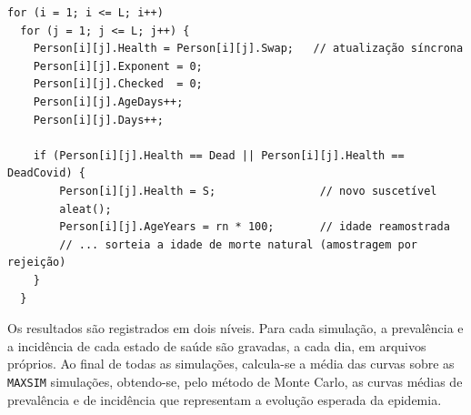 \begin{lstlisting}[caption={Atualização síncrona e substituição dos mortos (\texttt{Updatefunc}).}, label={lst:update}]
for (i = 1; i <= L; i++)
  for (j = 1; j <= L; j++) {
    Person[i][j].Health = Person[i][j].Swap;   // atualização síncrona
    Person[i][j].Exponent = 0;
    Person[i][j].Checked  = 0;
    Person[i][j].AgeDays++;
    Person[i][j].Days++;

    if (Person[i][j].Health == Dead || Person[i][j].Health == DeadCovid) {
        Person[i][j].Health = S;                // novo suscetível
        aleat();
        Person[i][j].AgeYears = rn * 100;       // idade reamostrada
        // ... sorteia a idade de morte natural (amostragem por rejeição)
    }
  }
\end{lstlisting}

Os resultados são registrados em dois níveis. Para cada simulação, a prevalência e a incidência de cada estado de saúde são gravadas, a cada dia, em arquivos próprios. Ao final de todas as simulações, calcula-se a média das curvas sobre as \texttt{MAXSIM} simulações, obtendo-se, pelo método de Monte Carlo, as curvas médias de prevalência e de incidência que representam a evolução esperada da epidemia.
